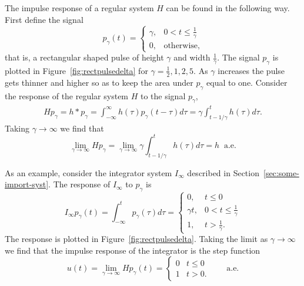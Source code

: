 The impulse response of a regular system $H$ can be found in the following way.  First define the signal
\[
p_\gamma(t) = \begin{cases}
\gamma, & 0 < t \leq \frac{1}{\gamma} \\
0, & \text{otherwise},
\end{cases}
\]
that is, a rectangular shaped pulse of height $\gamma$ and width $\tfrac{1}{\gamma}$.  The signal $p_\gamma$ is plotted in Figure~\ref{fig:rectpulsedelta} for $\gamma=\frac{1}{2},1,2,5$.  As $\gamma$ increases the pulse gets thinner and higher so as to keep the area under $p_\gamma$ equal to one.  Consider the response of the regular system $H$ to the signal $p_\gamma$,
\begin{align*}
H p_\gamma = h * p_\gamma = \int_{-\infty}^\infty h(\tau) p_\gamma(t - \tau) d\tau = \gamma \int_{t- 1/\gamma}^{t} h(\tau) d\tau.
\end{align*}
Taking $\gamma \to \infty$ we find that
\[
\lim_{\gamma \rightarrow \infty} H p_\gamma = \lim_{\gamma \rightarrow \infty} \gamma \int_{t- 1/\gamma}^{t} h(\tau) d\tau = h \;\; \text{a.e.}
\]


As an example, consider the integrator system $I_\infty$ described in Section~\ref{sec:some-import-syst}.  The response of $I_\infty$ to $p_\gamma$ is 
\[
I_\infty p_\gamma(t) = \int_{-\infty}^{t} p_\gamma(\tau) d\tau = \begin{cases}
0, & t \leq 0 \\
\gamma t, & 0 < t \leq \frac{1}{\gamma} \\
1, & t > \frac{1}{\gamma}.
\end{cases}
\]
The response is plotted in Figure~\ref{fig:rectpulsedelta}.  Taking the limit as $\gamma \rightarrow\infty$ we find that the impulse response of the integrator is the step function
\begin{equation}\label{eq:utimprespstep}
u(t) = \lim_{\gamma\rightarrow\infty} H p_\gamma(t) = \begin{cases}
0 & t \leq 0 \\
1 & t > 0.
\end{cases} \qquad \text{a.e.}
\end{equation}

